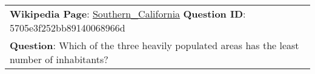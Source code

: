 \begin{figure*}[ht]
{\begin{tabular}{p{}}
            \textbf{Wikipedia Page}: \underline{Southern\_California} \textbf{Question ID}: 5705e3f252bb89140068966d                                                                                                                                                                                                                                                                                                                                                                                                                                                                                                                                                                                                                                                                                                                                                                                                                                                                                                                                                                                                                                                                                                    \\
            \textbf{Question}: Which of the three heavily populated areas has the least number of inhabitants?                                                                                                                                                                                                                                                                                                                                                                                                                                                                                                                                                                                                                                                                                                                                                                                                                                                                                                                                                                                                                                                                                                          \\

\end{tabular}}
\end{figure*}
